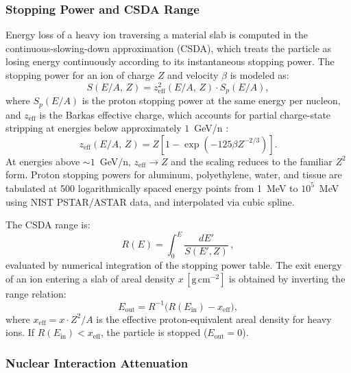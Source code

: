 \subsubsection{Stopping Power and CSDA Range}
\label{sec:bethe}

Energy loss of a heavy ion traversing a material slab is computed in the
continuous-slowing-down approximation (CSDA), which treats the particle as
losing energy continuously according to its instantaneous stopping power.
The stopping power for an ion of charge $Z$ and velocity $\beta$ is modeled as:
\begin{equation}
  S(E/A,\, Z) = z_\mathrm{eff}^2(E/A,\, Z) \cdot S_p(E/A),
  \label{eq:stopping}
\end{equation}
where $S_p(E/A)$ is the proton stopping power at the same energy per nucleon,
and $z_\mathrm{eff}$ is the Barkas effective charge, which accounts for
partial charge-state stripping at energies below approximately
$1$~GeV/n \citep{barkas1956}:
\begin{equation}
  z_\mathrm{eff}(E/A,\, Z) = Z \left[1 - \exp\!\left(-125\beta Z^{-2/3}\right)\right].
  \label{eq:zeff}
\end{equation}
At energies above $\sim 1$~GeV/n, $z_\mathrm{eff} \to Z$ and the scaling
reduces to the familiar $Z^2$ form.
Proton stopping powers for aluminum, polyethylene, water, and tissue are
tabulated at 500 logarithmically spaced energy points from 1~MeV to
$10^5$~MeV using NIST PSTAR/ASTAR data, and interpolated via cubic spline.

The CSDA range is:
\begin{equation}
  R(E) = \int_0^E \frac{dE'}{S(E', Z)}\,,
  \label{eq:range}
\end{equation}
evaluated by numerical integration of the stopping power table.
The exit energy of an ion entering a slab of areal density $x\,[\mathrm{g\,cm^{-2}}]$
is obtained by inverting the range relation:
\begin{equation}
  E_\mathrm{out} = R^{-1}\!\bigl(R(E_\mathrm{in}) - x_\mathrm{eff}\bigr),
  \label{eq:eout}
\end{equation}
where $x_\mathrm{eff} = x \cdot Z^2/A$ is the effective proton-equivalent
areal density for heavy ions.
If $R(E_\mathrm{in}) < x_\mathrm{eff}$, the particle is stopped ($E_\mathrm{out} = 0$).

\subsubsection{Nuclear Interaction Attenuation}
\label{sec:nuclear}

